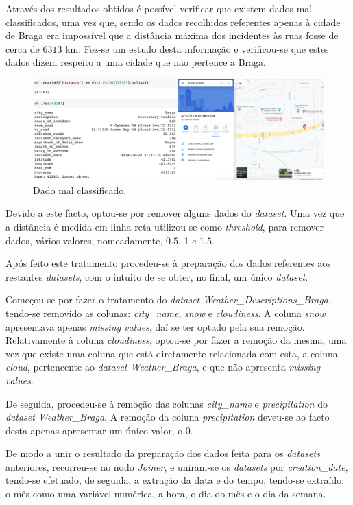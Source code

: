\documentclass[a4paper, 12pt]{article}
\begin{document}
Através dos resultados obtidos é possível verificar que existem dados mal classificados, uma vez que, sendo os dados recolhidos referentes apenas à cidade de Braga era impossível que a distância máxima dos incidentes às ruas fosse de cerca de $6313$ km. Fez-se um estudo desta informação e verificou-se que estes dados dizem respeito a uma cidade que não pertence a Braga.

\begin{figure}[H]
	\centering
	\includegraphics[width=14cm]{EUA}
	\caption{Dado mal classificado.}
\end{figure}

Devido a este facto, optou-se por remover alguns dados do \textit{dataset}. Uma vez que a distância é medida em linha reta utilizou-se como \textit{threshold}, para remover dados, vários valores, nomeadamente, $0.5$, $1$ e $1.5$.

Após feito este tratamento procedeu-se à preparação dos dados referentes aos restantes \textit{datasets}, com o intuito de se obter, no final, um único \textit{dataset}.

Começou-se por fazer o tratamento do \textit{dataset Weather\_Descriptions\_Braga}, tendo-se removido as colunas: \textit{city\_name}, \textit{snow} e \textit{cloudiness}. A coluna \textit{snow} apresentava apenas \textit{missing values}, daí se ter optado pela sua remoção. Relativamente à  coluna \textit{cloudiness}, optou-se por fazer a remoção da mesma, uma vez que existe uma coluna que está diretamente relacionada com esta, a coluna \textit{cloud}, pertencente ao \textit{dataset Weather\_Braga}, e que não apresenta \textit{missing values}.

De seguida, procedeu-se à remoção das colunas \textit{city\_name} e \textit{precipitation} do \textit{dataset Weather\_Braga}. A remoção da coluna \textit{precipitation} deveu-se ao facto desta apenas apresentar um único valor, o $0$. 

De modo a unir o resultado da preparação dos dados feita para os \textit{datasets} anteriores, recorreu-se ao nodo \textit{Joiner}, e uniram-se os \textit{datasets} por \textit{creation\_date}, tendo-se efetuado, de seguida, a extração da data e do tempo, tendo-se extraído: o mês como uma variável numérica, a hora, o dia do mês e o dia da semana.
\end{document}
